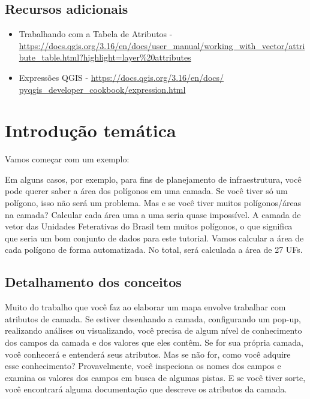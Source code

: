 \documentclass[
  portuguese,
]{krantz}
\providecommand{\tightlist}{%
  \setlength{\itemsep}{0pt}\setlength{\parskip}{0pt}}
\begin{document}
\hypertarget{recursos-adicionais-6}{%
\subsection{Recursos adicionais}\label{recursos-adicionais-6}}

\begin{itemize}
\tightlist
\item
  Trabalhando com a Tabela de Atributos - \url{https://docs.qgis.org/3.16/en/docs/user_manual/working_with_vector/attribute_table.html?highlight=layer\%20attributes}
\item
  Expressões QGIS - \href{https://docs.qgis.org/3.16/en/docs/pyqgis_developer_cookbook/expressions.html}{https://docs.qgis.org/3.16/en/docs/ pyqgis\_developer\_cookbook/expression.html}
\end{itemize}

\hypertarget{introduuxe7uxe3o-temuxe1tica-5}{%
\section{Introdução temática}\label{introduuxe7uxe3o-temuxe1tica-5}}

Vamos começar com um exemplo:

Em alguns casos, por exemplo, para fins de planejamento de infraestrutura, você pode querer saber a área dos polígonos em uma camada. Se você tiver só um polígono, isso não será um problema. Mas e se você tiver muitos polígonos/áreas na camada? Calcular cada área uma a uma seria quase impossível. A camada de vetor das Unidades Feterativas do Brasil tem muitos polígonos, o que significa que seria um bom conjunto de dados para este tutorial. Vamos calcular a área de cada polígono de forma automatizada. No total, será calculada a área de 27 UFs.

\hypertarget{detalhamento-dos-conceitos-2}{%
\subsection{Detalhamento dos conceitos}\label{detalhamento-dos-conceitos-2}}

Muito do trabalho que você faz ao elaborar um mapa envolve trabalhar com atributos de camada. Se estiver desenhando a camada, configurando um pop-up, realizando análises ou visualizando, você precisa de algum nível de conhecimento dos campos da camada e dos valores que eles contêm. Se for sua própria camada, você conhecerá e entenderá seus atributos. Mas se não for, como você adquire esse conhecimento? Provavelmente, você inspeciona os nomes dos campos e examina os valores dos campos em busca de algumas pistas. E se você tiver sorte, você encontrará alguma documentação que descreve os atributos da camada.
\end{document}
